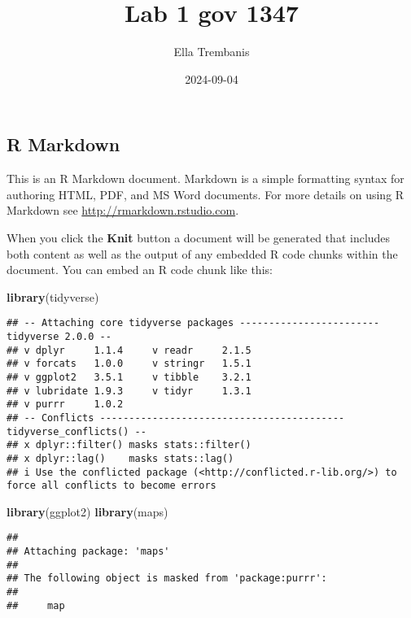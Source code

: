 \documentclass[
]{article}
\title{Lab 1 gov 1347}
\author{Ella Trembanis}
\date{2024-09-04}
\newenvironment{Shaded}{\begin{snugshade}}{\end{snugshade}}
\newcommand{\FunctionTok}[1]{\textcolor[rgb]{0.13,0.29,0.53}{\textbf{#1}}}
\newcommand{\NormalTok}[1]{#1}
\begin{document}
\maketitle

\subsection{R Markdown}\label{r-markdown}

This is an R Markdown document. Markdown is a simple formatting syntax
for authoring HTML, PDF, and MS Word documents. For more details on
using R Markdown see \url{http://rmarkdown.rstudio.com}.

When you click the \textbf{Knit} button a document will be generated
that includes both content as well as the output of any embedded R code
chunks within the document. You can embed an R code chunk like this:

\begin{Shaded}
\begin{Highlighting}[]
\FunctionTok{library}\NormalTok{(tidyverse)}
\end{Highlighting}
\end{Shaded}

\begin{verbatim}
## -- Attaching core tidyverse packages ------------------------ tidyverse 2.0.0 --
## v dplyr     1.1.4     v readr     2.1.5
## v forcats   1.0.0     v stringr   1.5.1
## v ggplot2   3.5.1     v tibble    3.2.1
## v lubridate 1.9.3     v tidyr     1.3.1
## v purrr     1.0.2     
## -- Conflicts ------------------------------------------ tidyverse_conflicts() --
## x dplyr::filter() masks stats::filter()
## x dplyr::lag()    masks stats::lag()
## i Use the conflicted package (<http://conflicted.r-lib.org/>) to force all conflicts to become errors
\end{verbatim}

\begin{Shaded}
\begin{Highlighting}[]
\FunctionTok{library}\NormalTok{(ggplot2)}
\FunctionTok{library}\NormalTok{(maps)}
\end{Highlighting}
\end{Shaded}

\begin{verbatim}
## 
## Attaching package: 'maps'
## 
## The following object is masked from 'package:purrr':
## 
##     map
\end{verbatim}
\end{document}
